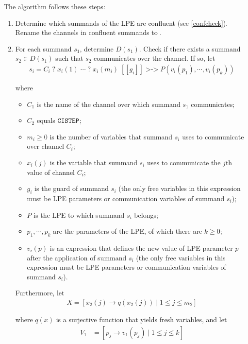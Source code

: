 The algorithm follows these steps:

\begin{enumerate}

\item Determine which \istep{} summands of the LPE are confluent (see \ref{confcheck}).
Rename the \istep{} channels in confluent \istep{} summands to \cistep{}.

\item For each summand $s_1$, determine $D(s_1)$.
Check if there exists a summand $s_2 \in D(s_1)$ such that $s_2$ communicates over the \cistep{} channel.
If so, let
\begin{align*}
s_i = C_i \; \texttt{?} \; x_i(1) \; \cdots{} \; \texttt{?} \; x_i(m_i) \; [[g_i]] \; \texttt{>->} \; P(v_i(p_1), \cdots{}, v_i(p_k))
\end{align*}

where

\begin{itemize}
\item $C_1$ is the name of the channel over which summand $s_1$ communicates;
\item $C_2$ equals $\texttt{CISTEP}{}$;
\item $m_i \geq 0$ is the number of variables that summand $s_i$ uses to communicate over channel $C_i$;
\item $x_i(j)$ is the variable that summand $s_i$ uses to communicate the $j$th value of channel $C_i$;
\item $g_i$ is the guard of summand $s_i$ (the only free variables in this expression must be LPE parameters or communication variables of summand $s_i$);
\item $P$ is the LPE to which summand $s_i$ belongs;
\item $p_1, \cdots{}, p_k$ are the parameters of the LPE, of which there are $k \geq 0$;
\item $v_i(p)$ is an expression that defines the new value of LPE parameter $p$ after the application of summand $s_i$ (the only free variables in this expression must be LPE parameters or communication variables of summand $s_i$).
\end{itemize}

Furthermore, let
\begin{align*}
X = [ x_2(j) \rightarrow q(x_2(j)) \;|\; 1 \leq j \leq m_2 ]
\end{align*}

where $q(x)$ is a surjective function that yields fresh variables, and let
\begin{align*}
V_{1} &= [p_j \rightarrow v_1(p_j) \;|\; 1 \leq j \leq k]
\end{align*}


\end{enumerate}

